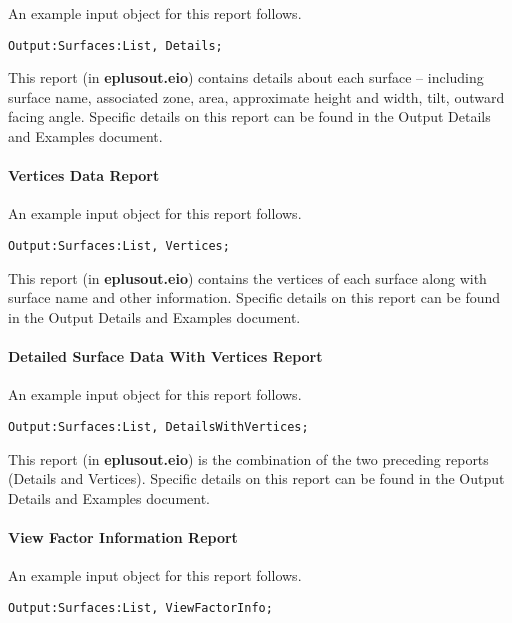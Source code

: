 An example input object for this report follows.

\begin{lstlisting}
Output:Surfaces:List, Details;
\end{lstlisting}

This report (in \textbf{eplusout.eio}) contains details about each surface -- including surface name, associated zone, area, approximate height and width, tilt, outward facing angle. Specific details on this report can be found in the Output Details and Examples document.

\paragraph{Vertices Data Report}\label{vertices-data-report}

An example input object for this report follows.

\begin{lstlisting}
Output:Surfaces:List, Vertices;
\end{lstlisting}

This report (in \textbf{eplusout.eio}) contains the vertices of each surface along with surface name and other information. Specific details on this report can be found in the Output Details and Examples document.

\paragraph{Detailed Surface Data With Vertices Report}\label{detailed-surface-data-with-vertices-report}

An example input object for this report follows.

\begin{lstlisting}
Output:Surfaces:List, DetailsWithVertices;
\end{lstlisting}

This report (in \textbf{eplusout.eio}) is the combination of the two preceding reports (Details and Vertices). Specific details on this report can be found in the Output Details and Examples document.

\paragraph{View Factor Information Report}\label{view-factor-information-report}

An example input object for this report follows.

\begin{lstlisting}
Output:Surfaces:List, ViewFactorInfo;
\end{lstlisting}

